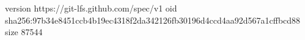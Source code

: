 version https://git-lfs.github.com/spec/v1
oid sha256:97b34e8451ccb4b19ec4318f2da342126fb30196d4ccd4aa92d567a1cffbcd88
size 87544
